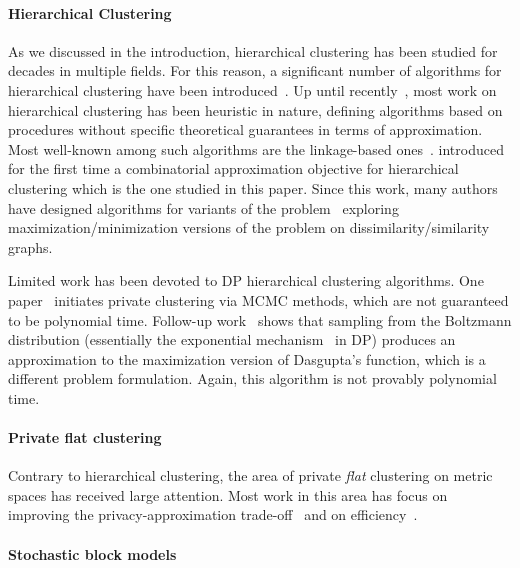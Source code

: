 \paragraph{Hierarchical Clustering}
As we discussed in the introduction, hierarchical clustering has been studied for decades in multiple fields. For this reason, a significant number of algorithms for hierarchical clustering have been introduced~\citep{murtagh2012algorithms}. Up until recently~\citep{dasgupta2016cost}, most work on hierarchical clustering has been heuristic in nature, defining algorithms based on procedures without specific theoretical guarantees in terms of approximation. Most well-known among such algorithms are the linkage-based ones~\citep{J10,bateni2017affinity}. \citet{dasgupta2016cost} introduced for the first time a combinatorial approximation objective for hierarchical clustering which is the one studied in this paper. Since this work, many authors have designed algorithms for variants of the problem~\citep{cohen2017hierarchical,cohen2019hierarchical, charikar2017approximate,moseley2017approximation, agarwal2022sublinear,chatziafratis2020bisect} exploring maximization/minimization versions of the problem on dissimilarity/similarity graphs.

Limited work has been devoted to DP hierarchical clustering algorithms. One paper~\citep{xiao2014differentially} initiates private clustering via MCMC methods, which are not guaranteed to be polynomial time. Follow-up work~\citep{kolluri2021private} shows that sampling from the Boltzmann distribution (essentially the exponential mechanism~\citep{mcsherry2007mechanism} in DP) produces an approximation to the maximization version of Dasgupta's function, which is a different problem formulation. Again, this algorithm is not provably polynomial time.

\paragraph{Private flat clustering}
Contrary to hierarchical clustering, the area of private {\it flat} clustering on metric spaces has received large attention. Most work in this area has focus on improving the privacy-approximation trade-off~\citep{ghazi2020differentially,balcan2017differentially} and on efficiency~\citep{hegde2021sok,cohennear,cohen2022scalable}.

\paragraph{Stochastic block models}

